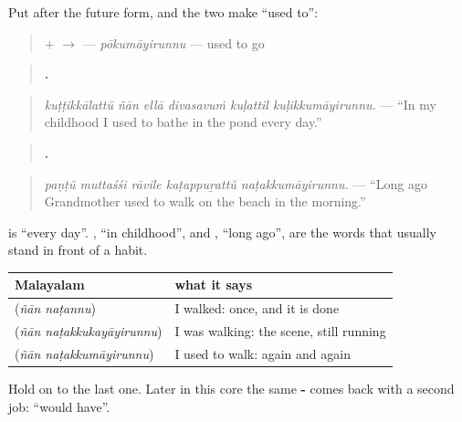\begin{grammarlens}[title={Grammar Lens: -\ml{ഉം} + \ml{ആയിരുന്നു}}]
Put \textbf{} after the future form, and the two make \textquotedblleft{}used to\textquotedblright{}:

\begin{quote}
 +  $\to$ \textbf{} — \emph{pōkumāyirunnu} — used to go
\end{quote}

\begin{quote}
\textbf{     .}
\end{quote}

\begin{quote}
\emph{kuṭṭikkālattŭ ñān ellā divasavuṁ kuḷattil kuḷikkumāyirunnu.} — \textquotedblleft{}In my childhood I used to bathe in the pond every day.\textquotedblright{}
\end{quote}

\begin{quote}
\textbf{    .}
\end{quote}

\begin{quote}
\emph{paṇṭŭ muttaśśi rāvile kaṭappuṟattŭ naṭakkumāyirunnu.} — \textquotedblleft{}Long ago Grandmother used to walk on the beach in the morning.\textquotedblright{}
\end{quote}

\textbf{ } is \textquotedblleft{}every day\textquotedblright{}. \textbf{}, \textquotedblleft{}in childhood\textquotedblright{}, and \textbf{}, \textquotedblleft{}long ago\textquotedblright{}, are the words that usually stand in front of a habit.
\end{grammarlens}

\begin{grammarlens}[title={Grammar Lens: three pasts side by side}]
\noindent
\begin{tabularx}{\linewidth}{@{}>{\raggedright\arraybackslash}X>{\raggedright\arraybackslash}X@{}}
\toprule
\textbf{Malayalam} & \textbf{what it says} \\
\midrule
\textbf{\ml{ഞാൻ} \ml{നടന്നു}} (\emph{ñān naṭannu}) & I walked: once, and it is done \\
\textbf{\ml{ഞാൻ} \ml{നടക്കുകയായിരുന്നു}} (\emph{ñān naṭakkukayāyirunnu}) & I was walking: the scene, still running \\
\textbf{\ml{ഞാൻ} \ml{നടക്കുമായിരുന്നു}} (\emph{ñān naṭakkumāyirunnu}) & I used to walk: again and again \\
\bottomrule
\end{tabularx}

Hold on to the last one. Later in this core the same \textbf{-} comes back with a second job: \textquotedblleft{}would have\textquotedblright{}.
\end{grammarlens}

